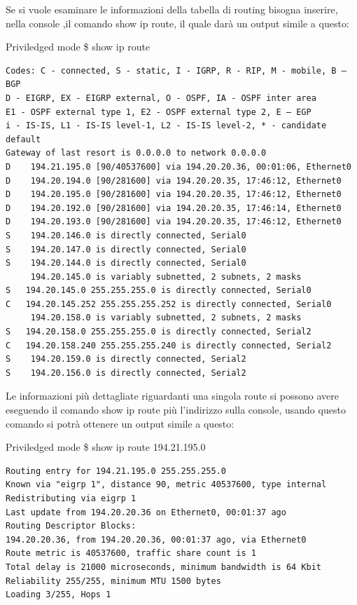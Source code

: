 Se si vuole esaminare le informazioni della tabella di routing bisogna inserire, nella console ,il comando show ip route, il quale darà un output simile a questo:

\begin{fcmds}{Priviledged mode}
    \$ show ip route
\end{fcmds}

\begin{verbatim}
Codes: C - connected, S - static, I - IGRP, R - RIP, M - mobile, B – BGP
D - EIGRP, EX - EIGRP external, O - OSPF, IA - OSPF inter area 
E1 - OSPF external type 1, E2 - OSPF external type 2, E – EGP
i - IS-IS, L1 - IS-IS level-1, L2 - IS-IS level-2, * - candidate default
Gateway of last resort is 0.0.0.0 to network 0.0.0.0
D    194.21.195.0 [90/40537600] via 194.20.20.36, 00:01:06, Ethernet0
D    194.20.194.0 [90/281600] via 194.20.20.35, 17:46:12, Ethernet0
D    194.20.195.0 [90/281600] via 194.20.20.35, 17:46:12, Ethernet0
D    194.20.192.0 [90/281600] via 194.20.20.35, 17:46:14, Ethernet0
D    194.20.193.0 [90/281600] via 194.20.20.35, 17:46:12, Ethernet0
S    194.20.146.0 is directly connected, Serial0
S    194.20.147.0 is directly connected, Serial0
S    194.20.144.0 is directly connected, Serial0
     194.20.145.0 is variably subnetted, 2 subnets, 2 masks
S   194.20.145.0 255.255.255.0 is directly connected, Serial0
C   194.20.145.252 255.255.255.252 is directly connected, Serial0
     194.20.158.0 is variably subnetted, 2 subnets, 2 masks
S   194.20.158.0 255.255.255.0 is directly connected, Serial2
C   194.20.158.240 255.255.255.240 is directly connected, Serial2
S    194.20.159.0 is directly connected, Serial2
S    194.20.156.0 is directly connected, Serial2
\end{verbatim}

Le informazioni più dettagliate riguardanti una singola route si possono avere eseguendo il comando show ip route più l'indirizzo sulla console, usando questo comando si potrà ottenere un output simile a questo:

\begin{fcmds}{Priviledged mode}
    \$ show ip route 194.21.195.0
\end{fcmds}

\begin{verbatim}
Routing entry for 194.21.195.0 255.255.255.0
Known via "eigrp 1", distance 90, metric 40537600, type internal
Redistributing via eigrp 1
Last update from 194.20.20.36 on Ethernet0, 00:01:37 ago
Routing Descriptor Blocks:
194.20.20.36, from 194.20.20.36, 00:01:37 ago, via Ethernet0
Route metric is 40537600, traffic share count is 1
Total delay is 21000 microseconds, minimum bandwidth is 64 Kbit
Reliability 255/255, minimum MTU 1500 bytes
Loading 3/255, Hops 1
\end{verbatim}

